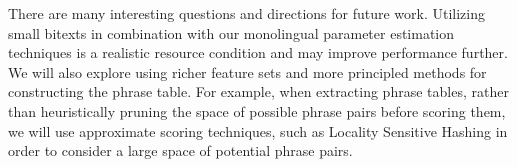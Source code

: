 \documentclass[11pt]{article}
\newcommand{\secref}[1]{Section~\ref{#1}}
\begin{document}
There are many interesting questions and directions for future work.  Utilizing small bitexts in combination with our monolingual parameter estimation techniques is a realistic resource condition and may improve performance further. We will also explore using richer feature sets and more principled methods for constructing the phrase table. For example, when extracting phrase tables, rather than heuristically pruning the space of possible phrase pairs before scoring them, we will use approximate scoring techniques, such as Locality Sensitive Hashing \cite{Charikar2002,VanDurme2010} in order to consider a large space of potential phrase pairs.








\end{document}

